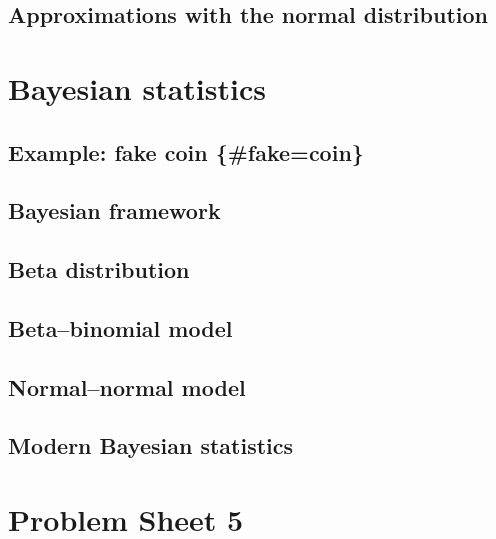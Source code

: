 \documentclass[
  a4paper,
]{book}
\theoremstyle{definition}
\theoremstyle{definition}
\theoremstyle{definition}
\theoremstyle{remark}
\begin{document}
\hypertarget{normal-approx}{%
\section{Approximations with the normal distribution}\label{normal-approx}}

\hypertarget{S10-bayesian}{%
\chapter{Bayesian statistics}\label{S10-bayesian}}

\hypertarget{example-fake-coin-fakecoin}{%
\section{Example: fake coin \{\#fake=coin\}}\label{example-fake-coin-fakecoin}}

\hypertarget{bayesian-framework}{%
\section{Bayesian framework}\label{bayesian-framework}}

\hypertarget{beta}{%
\section{Beta distribution}\label{beta}}

\hypertarget{beta-binomial}{%
\section{Beta--binomial model}\label{beta-binomial}}

\hypertarget{normal-normal}{%
\section{Normal--normal model}\label{normal-normal}}

\hypertarget{modern-bayes}{%
\section{Modern Bayesian statistics}\label{modern-bayes}}

\hypertarget{P5}{%
\chapter*{Problem Sheet 5}\label{P5}}
\end{document}
